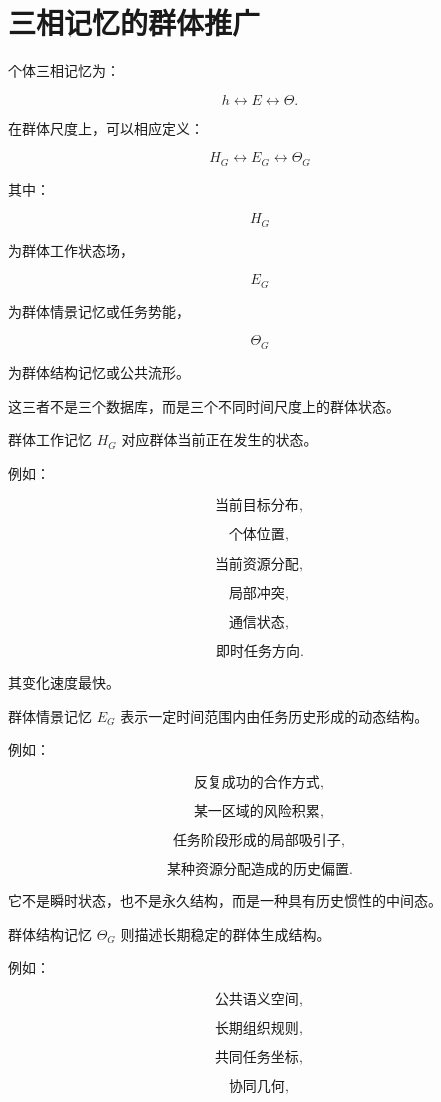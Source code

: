 \section{三相记忆的群体推广}

个体三相记忆为：

\[
h
\leftrightarrow
E
\leftrightarrow
\Theta.
\]

在群体尺度上，可以相应定义：

\[
\boxed{
H_G
\leftrightarrow
E_G
\leftrightarrow
\Theta_G
}
\]

其中：

\[
H_G
\]

为群体工作状态场，

\[
E_G
\]

为群体情景记忆或任务势能，

\[
\Theta_G
\]

为群体结构记忆或公共流形。

这三者不是三个数据库，而是三个不同时间尺度上的群体状态。

群体工作记忆 $H_G$ 对应群体当前正在发生的状态。

例如：

\[
\text{当前目标分布},
\]

\[
\text{个体位置},
\]

\[
\text{当前资源分配},
\]

\[
\text{局部冲突},
\]

\[
\text{通信状态},
\]

\[
\text{即时任务方向}.
\]

其变化速度最快。

群体情景记忆 $E_G$ 表示一定时间范围内由任务历史形成的动态结构。

例如：

\[
\text{反复成功的合作方式},
\]

\[
\text{某一区域的风险积累},
\]

\[
\text{任务阶段形成的局部吸引子},
\]

\[
\text{某种资源分配造成的历史偏置}.
\]

它不是瞬时状态，也不是永久结构，而是一种具有历史惯性的中间态。

群体结构记忆 $\Theta_G$ 则描述长期稳定的群体生成结构。

例如：

\[
\text{公共语义空间},
\]

\[
\text{长期组织规则},
\]

\[
\text{共同任务坐标},
\]

\[
\text{协同几何},
\]

